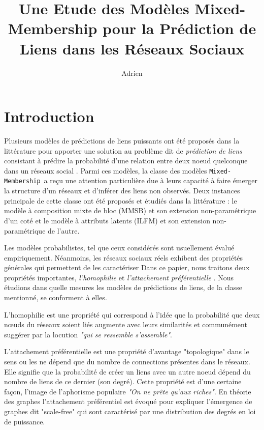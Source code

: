 \documentclass[french]{hermes-journal}
\title[]{Une Etude des Modèles Mixed-Membership pour la Prédiction de Liens dans les Réseaux Sociaux}
\author[1]{Adrien}{Dulac}
\newcommand{\mmm}{\texttt{Mixed-Membership}~}
\begin{document}
\maketitle

\newpage

\section{Introduction}

\label{sec:intro}

Plusieurs modèles de prédictions de liens puissants ont été proposés dans la littérature pour apporter une solution au problème dit de \textit{prédiction de liens} consistant à prédire la probabilité d'une relation entre deux noeud quelconque dans un réseaux social \cite{LibenNowell07, HassanZaki11}.
Parmi ces modèles, la classe des modèles \mmm a reçu une attention particulière due à leurs capacité à faire émerger la structure d'un réseaux et d'inférer des liens non observés.
Deux instances principale de cette classe ont été proposés et étudiés  dans la littérature : le modèle à composition mixte de bloc (MMSB) \cite{MMSB} et son extension non-paramétrique \cite{iMMSB, fan2015dynamic} d'un coté et le modèle à attributs latents (ILFM) \cite{BMF} et son extension non-paramétrique \cite{ILFRM} de l'autre. 


Les modèles probabilistes, tel que ceux considérés sont usuellement évalué empiriquement. Néanmoins, les réseaux sociaux réels exhibent des propriétés générales qui permettent de les caractériser Dans ce papier, nous traitons deux propriétés importantes, \textit{l'homophilie} et \textit{l'attachement préférentielle} \cite{Newman2010, Barabasi2003}. Nous étudions dans quelle mesures les modèles de prédictions de liens, de la classe mentionné, se conforment à elles. 

L'homophilie est une propriété qui correspond à l'idée que la probabilité que deux nœuds du réseaux soient liés augmente avec leurs similarités et communément suggérer par la locution \emph{"qui se ressemble s'assemble"}.

L'attachement préférentielle est une propriété d'avantage "topologique" dans le sens ou les ne dépend que du nombre de connections présentes dans le réseaux. Elle signifie que la probabilité de créer un liens avec un autre noeud dépend du nombre de liens de ce dernier (son degré). Cette propriété est d'une certaine façon, l'image de l'aphorisme populaire \emph{"On ne prête qu'aux riches"}. En théorie des graphes l'attachement préférentiel est évoqué pour expliquer l'émergence de graphes dit "scale-free" qui sont caractérisé par une distribution des degrés en loi de puissance.
\end{document}
